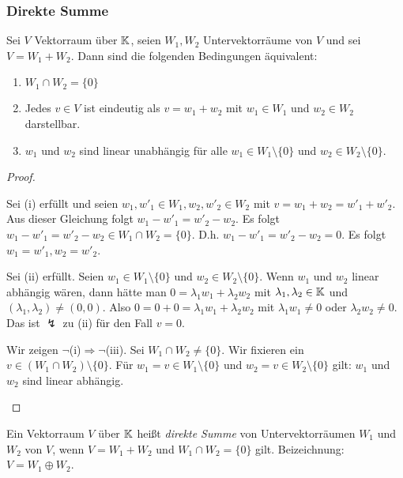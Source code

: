\subsubsection{Direkte Summe}

\begin{lm}
	Sei $ V $ Vektorraum über $ \mathbb K $, seien $ W_1, W_2 $ Untervektorräume von $ V $ und sei $ V = W_1 + W_2 $. Dann sind die folgenden Bedingungen äquivalent:
	\begin{enumerate}
		\item $ W_1 \cap W_2 = \{ 0 \} $
		\item Jedes $ v \in V $ ist eindeutig als $ v = w_1 + w_2 $ mit $ w_1 \in W_1 $ und $ w_2 \in W_2 $ darstellbar.
		\item $ w_1 $ und $ w_2 $ sind linear unabhängig für alle $ w_1 \in W_1\setminus\{0\} $ und $ w_2 \in W_2\setminus\{0\} $.
	\end{enumerate}
\end{lm}
\begin{proof}
\begin{description}[font=\normalfont]
	\item[(i)$ \Rightarrow $(ii):]
		Sei (i) erfüllt und seien $ w_1, w'_1 \in W_1, w_2, w'_2 \in W_2 $ mit $ v = w_1 + w_2 = w'_1 + w'_2 $. Aus dieser Gleichung folgt $ w_1 - w'_1 = w'_2 - w_2 $. Es folgt $ w_1 - w'_1 = w'_2 - w_2 \in W_1 \cap W_2 = \{ 0 \} $. D.h. $ w_1 - w'_1 = w'_2 - w_2 = 0 $. Es folgt $ w_1 = w'_1, w_2 = w'_2 $.
	\item[(ii)$ \Rightarrow $(iii):]
		Sei (ii) erfüllt. Seien $ w_1 \in W_1\setminus\{0\} $ und $ w_2 \in W_2\setminus\{0\} $. Wenn $ w_1 $ und $ w_2 $ linear abhängig wären, dann hätte man $ 0 = \lambda_1w_1 + \lambda_2w_2 $ mit $ \lambda_1, \lambda_2 \in \mathbb K $ und $ (\lambda_1,\lambda_2) \neq (0,0) $. Also $ 0 = 0 + 0 = \lambda_1w_1 + \lambda_2w_2 $ mit $ \lambda_1w_1 \neq 0 $ oder $ \lambda_2w_2 \neq 0 $. Das ist $ \lightning $ zu (ii) für den Fall $ v = 0 $.
	\item[(iii)$ \Rightarrow $(i):]
		Wir zeigen $ \neg $(i)$ \Rightarrow \neg $(iii). Sei $ W_1 \cap W_2 \neq \{ 0 \} $. Wir fixieren ein $ v \in (W_1 \cap W_2)\setminus\{0\} $. Für $ w_1 = v \in W_1\setminus\{0\} $ und $ w_2 = v \in W_2\setminus\{0\} $ gilt: $ w_1 $ und $ w_2 $ sind linear abhängig.
\end{description}
\end{proof}

Ein Vektorraum $ V $ über $ \mathbb K $ heißt \emph{direkte Summe} von Untervektorräumen $ W_1 $ und $ W_2 $ von $ V $, wenn $ V = W_1 + W_2 $ und $ W_1 \cap W_2 = \{ 0 \} $ gilt. Beizeichnung: $ V = W_1 \oplus W_2 $.

